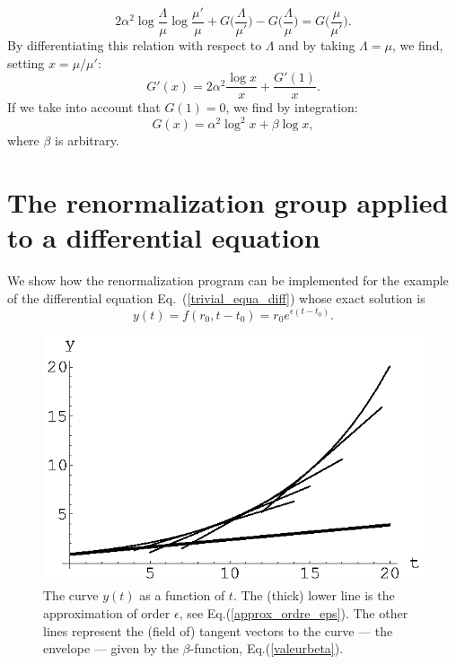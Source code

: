 \documentclass[floatfix,preprintnumbers,amsmath,amssymb,prb,12pt]{revtex4-1}
\begin{document}
{{\begin{equation}
2 \alpha^2\log\frac{\Lambda}{\mu} \log\frac{\mu'}{\mu} +
G\big(\frac{\Lambda}{\mu'}\big)-
G\big(\frac{\Lambda}{\mu}\big)= G\big(\frac{\mu}{\mu'}\big).
\label{equaG}
\end{equation}
By differentiating this relation with respect to $\Lambda$ and by taking $\Lambda=\mu$, we find, setting $x=\mu/\mu'$:
\begin{equation}
G'(x)=2 \alpha^2 \frac{\log x}{x} + \frac{G'(1)}{x}.
\end{equation}
If we take into account that $G(1)=0$, we find
by integration:
\begin{equation}
G(x)=\alpha^2 \log^2x +\beta \log x,
\end{equation}
where $\beta$ is arbitrary.

\section{The renormalization group applied to a differential equation}
\label{appendix_E}
We show how the renormalization program can be
implemented for the example of the differential equation
Eq.~(\ref{trivial_equa_diff}) whose exact solution is
\begin{equation}
y(t)=f(r_0,t-t_0)=r_0 e^{\epsilon(t-t_0)}.
\end{equation}

\begin{figure}[htbp] 
\begin{center}
\includegraphics[width=.9\linewidth,origin=tl]{enveloppe.eps}\hfill%
\end{center}
\caption{The curve $y(t)$ as a function of $t$. The (thick) lower line is the approximation of order $\epsilon$, see Eq.(\ref{approx_ordre_eps}). 
The other lines represent the (field of) tangent vectors to the curve  --- the envelope ---  given by the $\beta$-function, Eq.(\ref{valeurbeta}).}
\label{enveloppe}
\end{figure}

}}
\end{document}
